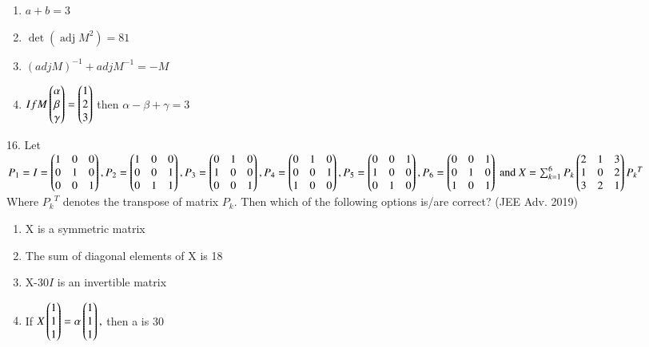 \documentclass[journal,12pt,twocolumn]{IEEEtran}
\theoremstyle{remark}
\begin{document}
\begin{enumerate}
    \item $a+b=3$
    \item $\mathop{det}(\mathop{adj}M^2)=81$
    \item $(adjM)^{-1}+adjM^{-1}=-M$
    \item $If M\begin{pmatrix}
        \alpha\\
        \beta\\
        \gamma
\end{pmatrix} = \begin{pmatrix}
        1\\
        2\\
        3
\end{pmatrix}$ then $\alpha-\beta+\gamma=3$\\[2pt]
\end{enumerate}

16. Let\\
$
P_1=I=\begin{pmatrix}
    1 & 0 & 0\\
    0 & 1 & 0\\
    0 & 0 & 1
\end{pmatrix}, P_2 = \begin{pmatrix}
    1 & 0 & 0\\
    0 & 0 & 1\\
    0 & 1 & 1
\end{pmatrix}, P_3 = \begin{pmatrix}
    0 & 1 & 0\\
    1 & 0 & 0\\
    0 & 0 & 1
\end{pmatrix}, P_4 = \begin{pmatrix}
    0 & 1 & 0\\
    0 & 0 & 1\\
    1 & 0 & 0
\end{pmatrix}, P_5 = \begin{pmatrix}
    0 & 0 & 1\\
    1 & 0 & 0\\
    0 & 1 & 0
\end{pmatrix}, P_6 = \begin{pmatrix}
    0 & 0 & 1\\
    0 & 1 & 0\\
    1 & 0 & 1
\end{pmatrix}
\text{ and } X = \sum_{k=1}^{6}P_k\begin{pmatrix}
    2 & 1 & 3\\
    1 & 0 & 2\\
    3 & 2 & 1
\end{pmatrix}{P_k}^T$\\Where ${P_k}^T$ denotes the transpose of matrix $P_k$. Then which of the following options is/are correct? \hfill (JEE Adv. 2019)

\begin{enumerate}
	\item X is a symmetric matrix
	\item The sum of diagonal elements of X is 18
	\item X-30$I$ is an invertible matrix
	\item If $X\begin{pmatrix}1\\1\\1\end{pmatrix}=\alpha\begin{pmatrix}1\\1\\1\end{pmatrix},$ then a is 30\\[2pt]
\end{enumerate}
\end{document}

